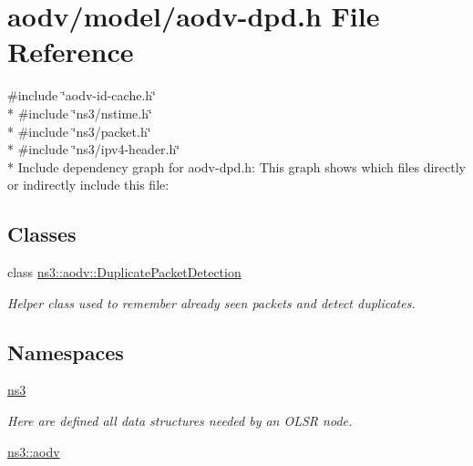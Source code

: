 \hypertarget{aodv-dpd_8h}{}\section{aodv/model/aodv-\/dpd.h File Reference}
\label{aodv-dpd_8h}
{\ttfamily \#include \char`\"{}aodv-\/id-\/cache.\+h\char`\"{}}\\*
{\ttfamily \#include \char`\"{}ns3/nstime.\+h\char`\"{}}\\*
{\ttfamily \#include \char`\"{}ns3/packet.\+h\char`\"{}}\\*
{\ttfamily \#include \char`\"{}ns3/ipv4-\/header.\+h\char`\"{}}\\*
Include dependency graph for aodv-\/dpd.h\+:
This graph shows which files directly or indirectly include this file\+:
\subsection*{Classes}
\begin{DoxyCompactItemize}
\item 
class \hyperlink{classns3_1_1aodv_1_1DuplicatePacketDetection}{ns3\+::aodv\+::\+Duplicate\+Packet\+Detection}
\begin{DoxyCompactList}\small\item\em Helper class used to remember already seen packets and detect duplicates. \end{DoxyCompactList}\end{DoxyCompactItemize}
\subsection*{Namespaces}
\begin{DoxyCompactItemize}
\item 
 \hyperlink{namespacens3}{ns3}
\begin{DoxyCompactList}\small\item\em Here are defined all data structures needed by an O\+L\+SR node. \end{DoxyCompactList}\item 
 \hyperlink{namespacens3_1_1aodv}{ns3\+::aodv}
\end{DoxyCompactItemize}
